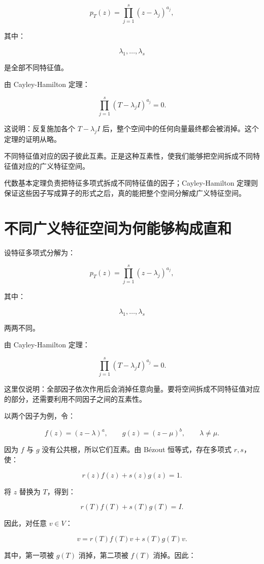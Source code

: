 \[
p_T(z)
=
\prod_{j=1}^s(z-\lambda_j)^{a_j},
\]

其中：

\[
\lambda_1,\ldots,\lambda_s
\]

是全部不同特征值。

由 Cayley-Hamilton 定理：

\[
\prod_{j=1}^s(T-\lambda_jI)^{a_j}=0.
\]

这说明：反复施加各个 $T-\lambda_jI$ 后，整个空间中的任何向量最终都会被消掉。这个定理的证明从略。

不同特征值对应的因子彼此互素。正是这种互素性，使我们能够把空间拆成不同特征值对应的广义特征空间。

\begin{jinsight}
代数基本定理负责把特征多项式拆成不同特征值的因子；Cayley-Hamilton 定理则保证这些因子写成算子的形式之后，真的能把整个空间分解成广义特征空间。
\end{jinsight}

\section{不同广义特征空间为何能够构成直和}

设特征多项式分解为：

\[
p_T(z)
=
\prod_{j=1}^s(z-\lambda_j)^{a_j},
\]

其中：

\[
\lambda_1,\ldots,\lambda_s
\]

两两不同。

由 Cayley-Hamilton 定理：

\[
\prod_{j=1}^s(T-\lambda_jI)^{a_j}=0.
\]

这里仅说明：全部因子依次作用后会消掉任意向量。要将空间拆成不同特征值对应的部分，还需要利用不同因子之间的互素性。

以两个因子为例，令：

\[
f(z)=(z-\lambda)^a,
\qquad
g(z)=(z-\mu)^b,
\qquad
\lambda\ne\mu.
\]

因为 $f$ 与 $g$ 没有公共根，所以它们互素。由 Bézout 恒等式，存在多项式 $r,s$，使：

\[
r(z)f(z)+s(z)g(z)=1.
\]

将 $z$ 替换为 $T$，得到：

\[
r(T)f(T)+s(T)g(T)=I.
\]

因此，对任意 $v\in V$：

\[
v
=
r(T)f(T)v+s(T)g(T)v.
\]

其中，第一项被 $g(T)$ 消掉，第二项被 $f(T)$ 消掉。因此：

